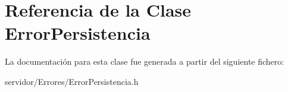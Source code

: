 \hypertarget{classErrorPersistencia}{\section{\-Referencia de la \-Clase \-Error\-Persistencia}
\label{classErrorPersistencia}
}


\-La documentación para esta clase fue generada a partir del siguiente fichero\-:\begin{DoxyCompactItemize}
\item 
servidor/\-Errores/\-Error\-Persistencia.\-h\end{DoxyCompactItemize}
